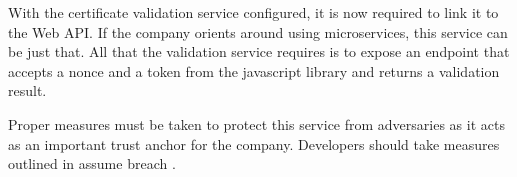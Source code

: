With the certificate validation service configured, it is now required to link it to the Web API. If the company orients around using microservices, this service can be just that. All that the validation service requires is to expose an endpoint that accepts a nonce and a token from the javascript library and returns a validation result.

Proper measures must be taken to protect this service from adversaries as it acts as an important trust anchor for the company. Developers should take measures outlined in assume breach .


